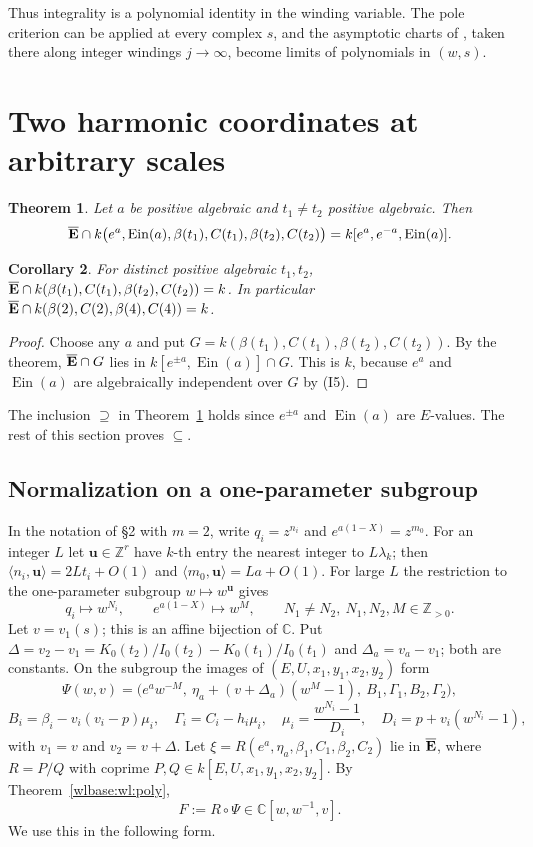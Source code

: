 \documentclass[11pt,a4paper]{article}
\newtheorem{theorem}{Theorem}[section]
\newtheorem{corollary}[theorem]{Corollary}
\theoremstyle{definition}\newtheorem{definition}[theorem]{Definition}
\theoremstyle{remark}\newtheorem{remark}[theorem]{Remark}
\newcommand{\Ein}{\operatorname{Ein}}
\newcommand{\C}{\mathbb C}\newcommand{\Z}{\mathbb Z}
\begin{document}
Thus integrality is a polynomial identity in the winding variable. The pole
criterion can be applied at every complex $s$, and the asymptotic charts of
\cite{EB}, taken there along integer windings $j\to\infty$, become limits of
polynomials in $(w,s)$.

\section{Two harmonic coordinates at arbitrary scales}

\begin{theorem}\label{wlbase:tb:main}
Let $a$ be positive algebraic and $t_1\ne t_2$ positive algebraic. Then
\[
 \Ebar\cap k\bigl(e^a,\Ein(a),\beta(t_1),C(t_1),\beta(t_2),C(t_2)\bigr)
 =k[e^a,e^{-a},\Ein(a)].
\]
\end{theorem}

\begin{corollary}\label{wlbase:tb:cor}
For distinct positive algebraic $t_1,t_2$,
$\overline{\mathbf E}\cap k(\beta(t_1),C(t_1),\beta(t_2),C(t_2))=k$. In particular
$\overline{\mathbf E}\cap k(\beta(2),C(2),\beta(4),C(4))=k$.
\end{corollary}

\begin{proof}
Choose any $a$ and put $G=k(\beta(t_1),C(t_1),\beta(t_2),C(t_2))$. By the
theorem, $\overline{\mathbf E}\cap G$ lies in $k[e^{\pm a},\Ein(a)]\cap G$. This is $k$,
because $e^a$ and $\Ein(a)$ are algebraically independent over $G$ by (I5).
\end{proof}

The inclusion $\supseteq$ in Theorem~\ref{wlbase:tb:main} holds since $e^{\pm a}$ and
$\Ein(a)$ are $E$-values. The rest of this section proves $\subseteq$.

\subsection{Normalization on a one-parameter subgroup}
In the notation of \S2 with $m=2$, write $q_i=z^{n_i}$ and $e^{a(1-X)}=z^{m_0}$.
For an integer $L$ let $\mathbf u\in\Z^r$ have $k$-th entry the nearest
integer to $L\lambda_k$; then $\langle n_i,\mathbf u\rangle=2Lt_i+O(1)$ and
$\langle m_0,\mathbf u\rangle=La+O(1)$. For large $L$ the restriction to the
one-parameter subgroup $w\mapsto w^{\mathbf u}$ gives
\[
 q_i\mapsto w^{N_i},\qquad e^{a(1-X)}\mapsto w^M,\qquad
 N_1\ne N_2,\ N_1,N_2,M\in\Z_{>0}.
\]
Let $v=v_1(s)$; this is an affine bijection of $\C$. Put
$\Delta=v_2-v_1=K_0(t_2)/I_0(t_2)-K_0(t_1)/I_0(t_1)$ and
$\Delta_a=v_a-v_1$; both are constants. On the subgroup the images of
$(E,U,x_1,y_1,x_2,y_2)$ form
\[
 \Psi(w,v)=\bigl(e^aw^{-M},\ \eta_a+(v+\Delta_a)(w^M-1),\
 B_1,\Gamma_1,B_2,\Gamma_2\bigr),
\]
\[
 B_i=\beta_i-v_i(v_i-p)\mu_i,\quad \Gamma_i=C_i-h_i\mu_i,\quad
 \mu_i=\frac{w^{N_i}-1}{D_i},\quad D_i=p+v_i(w^{N_i}-1),
\]
with $v_1=v$ and $v_2=v+\Delta$. Let $\xi=R(e^a,\eta_a,\beta_1,C_1,\beta_2,C_2)$
lie in $\overline{\mathbf E}$, where $R=P/Q$ with coprime $P,Q\in
k[E,U,x_1,y_1,x_2,y_2]$. By Theorem~\ref{wlbase:wl:poly},
\[
 F:=R\circ\Psi\in\C[w,w^{-1},v].
\]
We use this in the following form.
\end{document}
